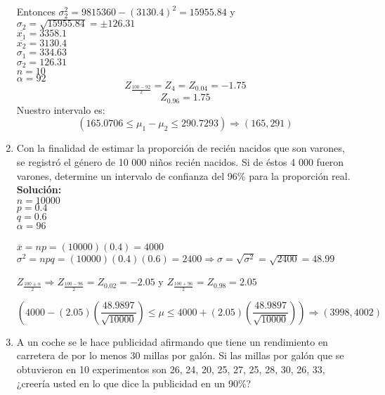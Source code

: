 \begin{enumerate}
    Entonces $ \sigma_{2}^2 = 9815360 -(3130.4)^2 = 15955.84 $ y $\sigma_{2} = \sqrt{15955.84} = \pm 126.31 $ \\
    $ \overline{x_{1}} = 3358.1$ \\ 
    $ \overline{x_{2}} = 3130.4 $ \\
    $ \sigma_{1} = 334.63 $ \\ 
    $ \sigma_{2} = 126.31 $ \\ 
    $ n = 10 $ \\ 
    $  \alpha = 92$ \\
    
    $$ Z_{ \frac{100-92}{2} }  =  Z_{4} = Z_{0.04} = -1.75 $$  $$ Z_{0.96} = 1.75 $$
     Nuestro intervalo es:
    $$(165.0706 \leq \mu_{1} - \mu_{2} \leq 290.7293) \Rightarrow (165,291)  $$ 
    \item Con la finalidad de estimar la proporción de recién nacidos que son varones, se registró el género de 10 000 niños recién nacidos. Si de éstos 4 000 fueron varones, determine un intervalo de confianza del 96\% para la proporción real. \\
    \textbf{Solución: } \\
    $ n = 10000 $ \\
    $ p = 0.4 $ \\ 
    $ q = 0.6 $ \\ 
    $ \alpha = 96 $ \\ \\
    $ \overline{x} = np = (10000)(0.4) = 4000 $ \\
    $ \sigma^2 = npq = (10000)(0.4)(0.6) = 2400  \Rightarrow \sigma = \sqrt{\sigma^2} = \sqrt{2400} = 48.99 $ \\
    
    \begin{center}
        $ Z_{\frac{100 \pm \alpha}{2}} \Rightarrow  Z_{\frac{100-96}{2}} = Z_{0.02} = -2.05 $ y $ Z_{\frac{100+96}{2}} = Z_{0.98} = 2.05  $ 
    \end{center}
    
    $$  \left(   4000 - (2.05)\left( \frac{48.9897}{\sqrt{10000}} \right)   \leq \mu \leq 4000 + (2.05)\left( \frac{48.9897}{\sqrt{10000}} \right)      \right)   \Rightarrow (3998,4002) $$
    \item A un coche se le hace publicidad afirmando que tiene un rendimiento en carretera de por lo menos 30 millas por galón. Si las millas por galón que se obtuvieron en 10 experimentos son 26, 24, 20, 25, 27, 25, 28, 30, 26, 33, ¿creería usted en lo que dice la publicidad en un 90\%? \\
    

\end{enumerate}

